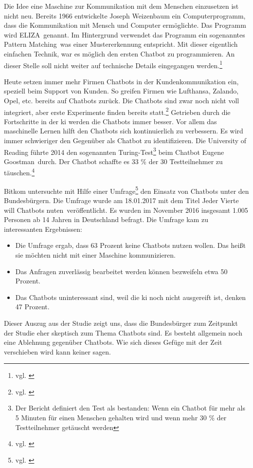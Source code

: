 Die Idee eine Maschine zur Kommunikation mit dem Menschen einzusetzen ist nicht neu. Bereits 1966 entwickelte Joseph Weizenbaum ein Computerprogramm, dass die Kommunikation mit Mensch und Computer ermöglichte. Das Programm wird \glqq ELIZA\grqq\ genannt. Im Hintergrund verwendet das Programm ein sogenanntes \glqq Pattern Matching\grqq\, was einer Mustererkennung entspricht. Mit dieser eigentlich einfachen Technik, war es möglich den ersten Chatbot zu programmieren. An dieser Stelle soll nicht weiter auf technische Details eingegangen werden.\footnote{vgl. \cite{WikiELIZA}}    

Heute setzen immer mehr Firmen Chatbots in der Kundenkommunikation ein, speziell beim Support von Kunden. So greifen Firmen wie Lufthansa, Zalando, Opel, etc. bereits auf Chatbots zurück. Die Chatbots sind zwar noch nicht voll integriert, aber erste Experimente finden bereits statt.\footnote{vgl. \cite{UnternehmenChatbots}} Getrieben durch die Fortschritte in der \ac{ki} werden die Chatbots immer besser. Vor allem das maschinelle Lernen hilft den Chatbots sich kontinuierlich zu verbessern. Es wird immer schwieriger den Gegenüber als Chatbot zu identifizieren. Die University of Reading führte 2014 den sogenannten Turing-Test\footnote{Der Bericht definiert den Test als bestanden: Wenn ein Chatbot für mehr als 5 Minuten für einen Menschen gehalten wird und wenn mehr 30 \% der Testteilnehmer getäuscht werden} beim Chatbot \glqq Eugene Goostman\grqq\ durch. Der Chatbot schaffte es 33 \% der 30 Testteilnehmer zu täuschen.\footnote{vgl. \cite{UnivOfReading}}

Bitkom untersuchte mit Hilfe einer Umfrage\footnote{vgl. \cite{BitkomChatbot}} den Einsatz von Chatbots unter den Bundesbürgern. Die Umfrage wurde am 18.01.2017 mit dem Titel \glqq Jeder Vierte will Chatbots nuten\grqq\ veröffentlicht. Es wurden im November 2016 insgesamt 1.005 Personen ab 14 Jahren in Deutschland befragt. Die Umfrage kam zu interessanten Ergebnissen:
\begin{itemize}
 	\item Die Umfrage ergab, dass 63 Prozent keine Chatbots nutzen wollen. Das heißt sie möchten nicht mit einer Maschine kommunizieren. 
	 \item Das Anfragen zuverlässig bearbeitet werden können bezweifeln etwa 50 Prozent.
	 \item Das Chatbots uninteressant sind, weil die \ac{ki} noch nicht ausgereift ist, denken 47 Prozent.
\end{itemize}
Dieser Auszug aus der Studie zeigt uns, dass die Bundesbürger zum Zeitpunkt der Studie eher skeptisch zum Thema Chatbots sind. Es besteht allgemein noch eine Ablehnung gegenüber Chatbots. Wie sich dieses Gefüge mit der Zeit verschieben wird kann keiner sagen.  


